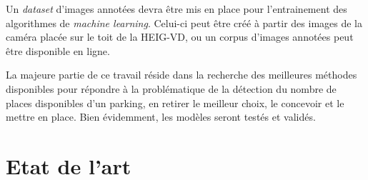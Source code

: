 Un \textit{dataset} d'images annotées devra être mis en place pour l'entrainement des algorithmes de \textit{machine learning}. Celui-ci peut être créé à partir des images de la caméra placée sur le toit de la HEIG-VD, ou un corpus d'images annotées peut être disponible en ligne.

La majeure partie de ce travail réside dans la recherche des meilleures méthodes disponibles pour répondre à la problématique de la détection du nombre de places disponibles d'un parking, en retirer le meilleur choix, le concevoir et le mettre en place. Bien évidemment, les modèles seront testés et validés.

\section{Etat de l'art}